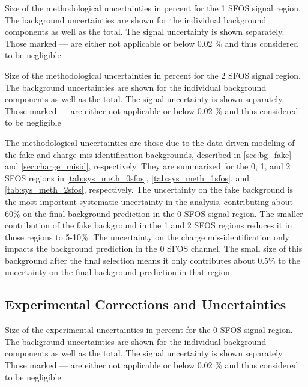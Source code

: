 \begin{table}[ht!]
\centering

\caption{Size of the methodological uncertainties in percent for the 1 SFOS signal region. The background uncertainties are shown for the individual background components as well as the total. The signal uncertainty is shown separately. Those marked --- are either not applicable or below 0.02 \% and thus considered to be negligible}
\label{tab:sys_meth_1sfos}
\end{table}

\begin{table}[ht!]
\centering

\caption{Size of the methodological uncertainties in percent for the 2 SFOS signal region. The background uncertainties are shown for the individual background components as well as the total. The signal uncertainty is shown separately. Those marked --- are either not applicable or below 0.02 \% and thus considered to be negligible}
\label{tab:sys_meth_2sfos}
\end{table}

The methodological uncertainties are those due to the data-driven
modeling of the fake and charge mis-identification backgrounds,
described in \sec\ref{sec:bg_fake} and \sec\ref{sec:charge_misid},
respectively.
They are summarized for the 0, 1, and 2 SFOS regions
in \tab\ref{tab:sys_meth_0sfos}, 
\tab\ref{tab:sys_meth_1sfos}, and
\tab\ref{tab:sys_meth_2sfos}, respectively.
The uncertainty on the fake background is the most important
systematic uncertainty in the analysis, contributing about 60\%
on the final background prediction in the 0 SFOS signal region.
The smaller contribution of the fake background in the 1 and 2 SFOS
regions reduces it in those regions to 5-10\%.
The uncertainty on the charge mis-identification only impacts the 
background prediction in the 0 SFOS channel.  The small size
of this background after the final selection means it only contributes
about 0.5\% to the uncertainty on the final background prediction in that
region.

\subsection{Experimental Corrections and Uncertainties}
\begin{table}[ht!]
\centering

\caption{Size of the experimental uncertainties in percent for the 0 SFOS signal region. The background uncertainties are shown for the individual background components as well as the total. The signal uncertainty is shown separately. Those marked --- are either not applicable or below 0.02 \% and thus considered to be negligible}
\label{tab:sys_exp_0sfos}
\end{table}

